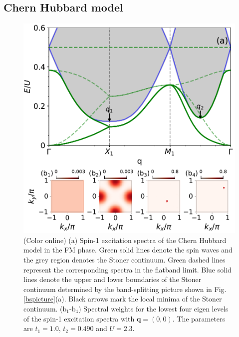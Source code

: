 \documentclass[amsmath,superscriptaddress,showpacs,aps,prb,twocolumn]{revtex4-1}
\begin{document}
\subsection{Chern Hubbard model}\label{CHM}
\begin{figure}
\includegraphics[width=\columnwidth]{fmcispectrum}
\caption{(Color online) (a) Spin-1 excitation spectra of the Chern Hubbard model in the FM phase. Green solid lines denote the spin waves and the grey region denotes the Stoner continuum. Green dashed lines represent the corresponding spectra in the flatband limit. Blue solid lines denote the upper and lower boundaries of the Stoner continuum determined by the band-splitting picture shown in Fig. \ref{bspicture}(a). Black arrows mark the local minima of the Stoner continuum. (b$_1$-b$_4$) Spectral weights for the lowest four eigen levels of the spin-1 excitation spectra with $\mathbf{q}=(0,0)$. The parameters are $t_1=1.0$, $t_2=0.490$ and $U=2.3$.}
\label{fmcispectrum}
\end{figure}
\end{document}
